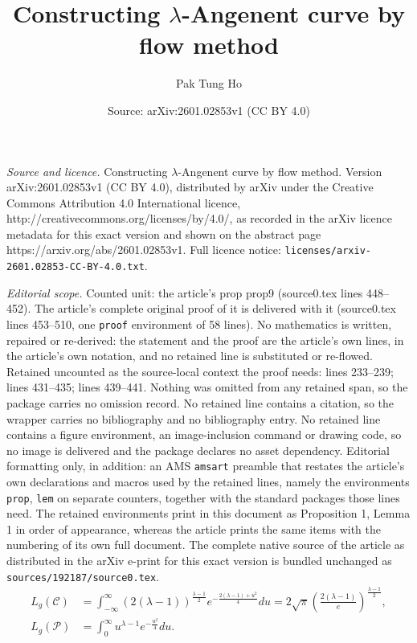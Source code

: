\documentclass[10pt,a4paper]{amsart}
\title{Constructing $\lambda$-Angenent curve by flow method}
\author{Pak Tung Ho}
\date{Source: arXiv:2601.02853v1 (CC BY 4.0)}
\begin{document}
\maketitle

\noindent\emph{Source and licence.} Constructing $\lambda$-Angenent curve by flow method. Version arXiv:2601.02853v1 (CC BY 4.0), distributed by arXiv under the Creative Commons Attribution 4.0 International licence, http://creativecommons.org/licenses/by/4.0/, as recorded in the arXiv licence metadata for this exact version and shown on the abstract page https://arxiv.org/abs/2601.02853v1. Full licence notice: \texttt{licenses/arxiv-2601.02853-CC-BY-4.0.txt}.\par\smallskip

\noindent\textit{Editorial scope.} Counted unit: the article's prop prop9 (source0.tex lines 448--452). The article's complete original proof of it is delivered with it (source0.tex lines 453--510, one \texttt{proof} environment of 58 lines). No mathematics is written, repaired or re-derived: the statement and the proof are the article's own lines, in the article's own notation, and no retained line is substituted or re-flowed.  Retained uncounted as the source-local context the proof needs: lines 233--239; lines 431--435; lines 439--441.  Nothing was omitted from any retained span, so the package carries no omission record.  No retained line contains a citation, so the wrapper carries no bibliography and no bibliography entry.  No retained line contains a figure environment, an image-inclusion command or drawing code, so no image is delivered and the package declares no asset dependency.  Editorial formatting only, in addition: an AMS \texttt{amsart} preamble that restates the article's own declarations and macros used by the retained lines, namely the environments \texttt{prop}, \texttt{lem} on separate counters, together with the standard packages those lines need.  The retained environments print in this document as Proposition 1, Lemma 1 in order of appearance, whereas the article prints the same items with the numbering of its own full document.  The complete native source of the article as distributed in the arXiv e-print for this exact version is bundled unchanged as \texttt{sources/192187/source0.tex}.
\begin{equation}\label{1.5}
\begin{split}
L_g(\mathcal{C})&=\int_{-\infty}^\infty (2(\lambda-1))^{\frac{\lambda-1}{2}}e^{-\frac{2(\lambda-1)+u^2}{4}}du
=2\sqrt{\pi}\left(\frac{2(\lambda-1)}{e}\right)^{\frac{\lambda-1}{2}},\\
L_g(\mathcal{P})&=\int_0^\infty u^{\lambda-1} e^{-\frac{u^2}{4}}du.
\end{split}
\end{equation}
\end{document}
